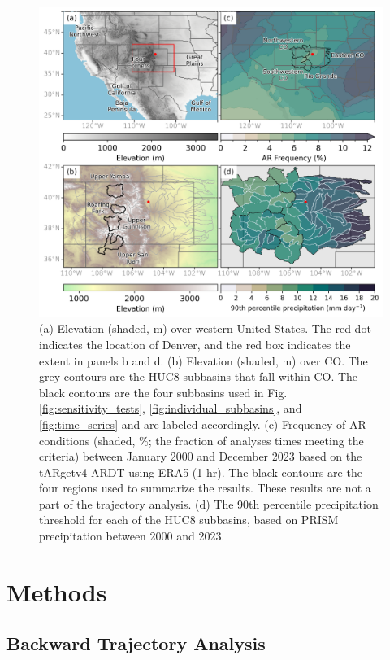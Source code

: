 \documentclass[draft]{agujournal2019}
\begin{document}
\begin{figure}
\noindent\includegraphics[width=\textwidth, height=\textheight, keepaspectratio]{fig1.png}
\caption{(a) Elevation (shaded, m) over western United States. The red dot indicates the location of Denver, and the red box indicates the extent in panels b and d. (b) Elevation (shaded, m) over CO. The grey contours are the HUC8 subbasins that fall within CO. The black contours are the four subbasins used in Fig. \ref{fig:sensitivity_tests}, \ref{fig:individual_subbasins}, and \ref{fig:time_series} and are labeled accordingly. (c) Frequency of AR conditions (shaded, \%; the fraction of analyses times meeting the criteria) between January 2000 and December 2023 based on the tARgetv4 ARDT using ERA5 (1-hr). The black contours are the four regions used to summarize the results. These results are not a part of the trajectory analysis. (d) The 90th percentile precipitation threshold for each of the HUC8 subbasins, based on PRISM precipitation between 2000 and 2023.}
\label{fig:elevation}
\end{figure}


\section{Methods}
\label{sec:methods}
\subsection{Backward Trajectory Analysis}
\end{document}
